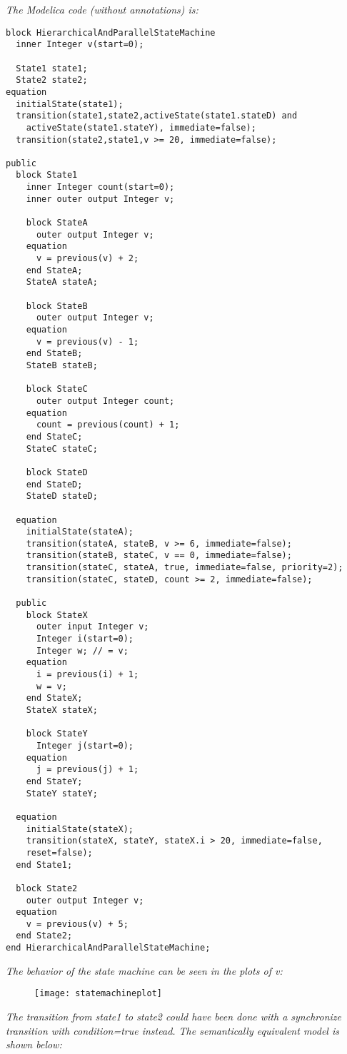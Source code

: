 \emph{The Modelica code (without annotations) is:}

\begin{lstlisting}[language=modelica]
block HierarchicalAndParallelStateMachine
  inner Integer v(start=0);

  State1 state1;
  State2 state2;
equation
  initialState(state1);
  transition(state1,state2,activeState(state1.stateD) and
    activeState(state1.stateY), immediate=false);
  transition(state2,state1,v >= 20, immediate=false);

public
  block State1
    inner Integer count(start=0);
    inner outer output Integer v;

    block StateA
      outer output Integer v;
    equation
      v = previous(v) + 2;
    end StateA;
    StateA stateA;

    block StateB
      outer output Integer v;
    equation
      v = previous(v) - 1;
    end StateB;
    StateB stateB;

    block StateC
      outer output Integer count;
    equation
      count = previous(count) + 1;
    end StateC;
    StateC stateC;

    block StateD
    end StateD;
    StateD stateD;

  equation
    initialState(stateA);
    transition(stateA, stateB, v >= 6, immediate=false);
    transition(stateB, stateC, v == 0, immediate=false);
    transition(stateC, stateA, true, immediate=false, priority=2);
    transition(stateC, stateD, count >= 2, immediate=false);

  public
    block StateX
      outer input Integer v;
      Integer i(start=0);
      Integer w; // = v;
    equation
      i = previous(i) + 1;
      w = v;
    end StateX;
    StateX stateX;

    block StateY
      Integer j(start=0);
    equation
      j = previous(j) + 1;
    end StateY;
    StateY stateY;

  equation
    initialState(stateX);
    transition(stateX, stateY, stateX.i > 20, immediate=false,
    reset=false);
  end State1;

  block State2
    outer output Integer v;
  equation
    v = previous(v) + 5;
  end State2;
end HierarchicalAndParallelStateMachine;
\end{lstlisting}

\emph{The behavior of the state machine can be seen in the plots of v:}
\begin{figure}[H]
\texttt{[image: statemachineplot]}
\end{figure}
\emph{The transition from state1 to state2 could have been done with a
synchronize transition with condition=true instead. The semantically
equivalent model is shown below:}

